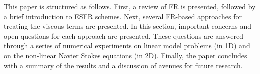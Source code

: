 \vspace{0.1 in}

\noindent This paper is structured as follows. First, a review of FR is presented, followed by a brief introduction to ESFR schemes. Next, several FR-based approaches for treating the viscous terms are presented. In this section, important concerns and open questions for each approach are presented. These questions are answered through a series of numerical experiments on linear model problems (in 1D) and on the non-linear Navier Stokes equations (in 2D). Finally, the paper concludes with a summary of the results and a discussion of avenues for future research.
